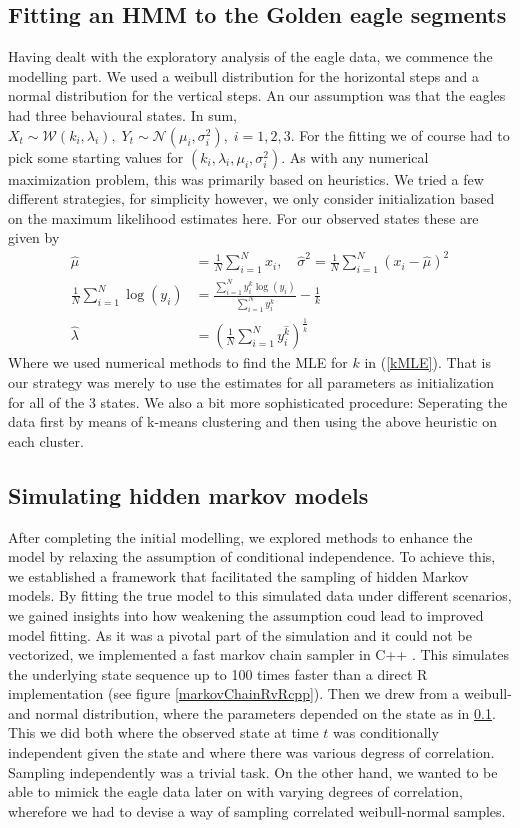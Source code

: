 \subsection{Fitting an HMM to the Golden eagle segments}\label{hmmGoldenEagle}
Having dealt with the exploratory analysis of the eagle data, we commence the modelling part. We used a weibull distribution for the horizontal steps and a normal distribution for the vertical steps. An our assumption was that the eagles had three behavioural states. In sum, $X_t \sim \mathcal{W}(k_i, \lambda_i), \; Y_t \sim \mathcal{N}(\mu_i, \sigma_i^2), \; i = 1,2,3$. For the fitting we of course  had to pick some starting values for $(k_i, \lambda_i, \mu_i, \sigma_i^2)$. As with any numerical maximization problem, this was primarily based on heuristics. We tried a few different strategies, for simplicity however, we only consider initialization based on the maximum likelihood estimates here. For our observed states these are given by\cite{Cohen1965}
\begin{align}
    \hat{\mu} &= \frac{1}{N}\sum_{i = 1}^N x_i, \quad \hat{\sigma}^2 = \frac{1}{N}\sum_{i = 1}^N \left(x_i-\hat{\mu}\right)^2\\
    \frac{1}{N}\sum_{i = 1}^N \log(y_i)&= \frac{\sum_{i = 1}^N y_i^k\log(y_i)}{\sum_{i = 1}^N y_i^k} - \frac{1}{k} \label{kMLE} \\  \hat{\lambda} &= \left(\frac{1}{N} \sum_{i = 1}^N y_i^{\hat{k}}\right)^{\frac{1}{\hat{k}}}
\end{align}
Where we used numerical methods to find the MLE for $k$ in (\ref{kMLE}). That is our strategy was merely to use the estimates for all parameters as initialization for all of the $3$ states. We also a bit more sophisticated procedure: Seperating the data first by means of k-means clustering \cite{RLang} and then using the above heuristic on each cluster.
\subsection{Simulating hidden markov models}\label{simHMM}
After completing the initial modelling, we explored methods to enhance the model by relaxing the assumption of conditional independence. To achieve this, we established a framework that facilitated the sampling of hidden Markov models. By fitting the true model to this simulated data under different scenarios, we gained insights into how weakening the assumption coud lead to improved model fitting. As it was a pivotal part of the simulation and it could not be vectorized, we implemented a fast markov chain sampler in C++ \cite{Rcpp}. This simulates the underlying state sequence up to 100 times faster than a direct R implementation (see figure \ref{markovChainRvRcpp}). Then we drew from a weibull- and normal distribution, where the parameters depended on the state as in \ref{hmmGoldenEagle}. This we did both where the observed state at time $t$ was conditionally independent given the state and where there was various degress of correlation. Sampling independently was a trivial task. On the other hand, we wanted to be able to mimick the eagle data later on with varying degrees of correlation, wherefore we had to devise a way of sampling correlated weibull-normal samples. 
